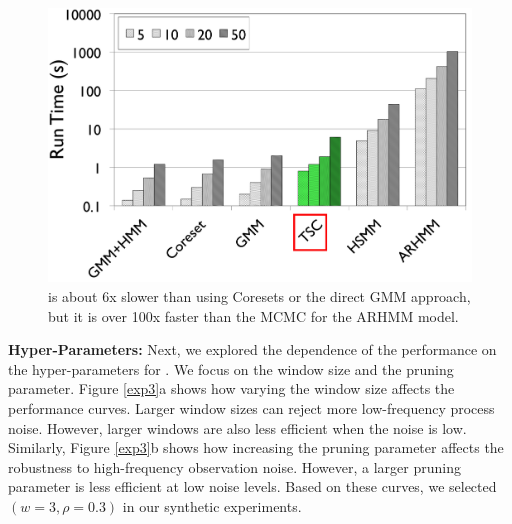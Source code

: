 \begin{figure}[ht!]
\centering
\includegraphics[width=0.8\columnwidth]{tsc-experiments/bw_runtime.png}
\caption{\tsc is about 6x slower than using Coresets or the direct GMM approach, but it is over 100x faster than the MCMC for the ARHMM model.\label{runtime}}
\end{figure}


\textbf{\tsc Hyper-Parameters: }
Next, we explored the dependence of the performance on the hyper-parameters for \tsc.
We focus on the window size and the pruning parameter.
Figure \ref{exp3}a shows how varying the window size affects the performance curves.
Larger window sizes can reject more low-frequency process noise.
However, larger windows are also less efficient when the noise is low.
Similarly, Figure \ref{exp3}b shows how increasing the pruning parameter affects the robustness to high-frequency observation noise.
However, a larger pruning parameter is less efficient at low noise levels. 
Based on these curves, we selected $(w=3, \rho=0.3)$ in our synthetic experiments.

